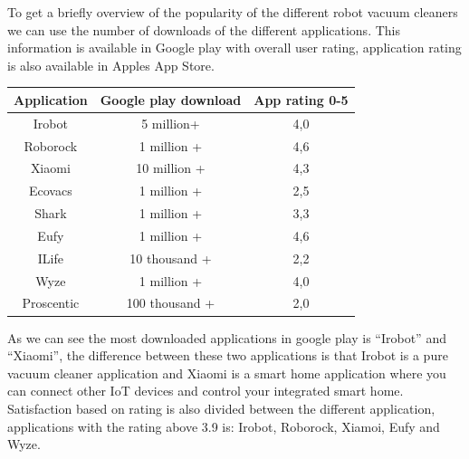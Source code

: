 To get a briefly overview of the popularity of the different robot vacuum cleaners we can use the number of downloads of the different applications. This information is available in Google play with overall user rating, application rating is also available in Apples App Store. 

\begin{table}[]
\begin{tabular}{|c|c|c|}
\hline
Application & Google play download & App rating 0-5 \\ \hline
Irobot      & 5 million+           & 4,0            \\ \hline
Roborock    & 1 million +          & 4,6            \\ \hline
Xiaomi      & 10 million +         & 4,3            \\ \hline
Ecovacs     & 1 million +          & 2,5            \\ \hline
Shark       & 1 million +          & 3,3            \\ \hline
Eufy        & 1 million +          & 4,6            \\ \hline
ILife       & 10 thousand +        & 2,2            \\ \hline
Wyze        & 1 million +          & 4,0            \\ \hline
Proscentic  & 100 thousand +       & 2,0            \\ \hline
\end{tabular}
\end{table}

As we can see the most downloaded applications in google play is “Irobot” and “Xiaomi”, the difference between these two applications is that Irobot is a pure vacuum cleaner application and Xiaomi is a smart home application where you can connect other IoT devices and control your integrated smart home.  
Satisfaction based on rating is also divided between the different application, applications with the rating above 3.9 is: Irobot, Roborock, Xiamoi, Eufy and Wyze. 

